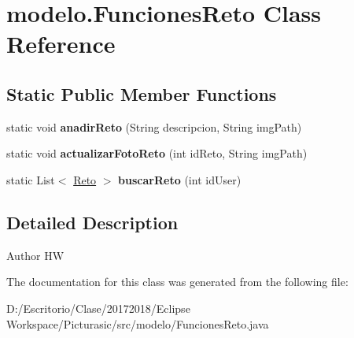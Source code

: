 \hypertarget{classmodelo_1_1_funciones_reto}{}\section{modelo.\+Funciones\+Reto Class Reference}
\label{classmodelo_1_1_funciones_reto}
\subsection*{Static Public Member Functions}
\begin{DoxyCompactItemize}
\item 
\mbox{\label{classmodelo_1_1_funciones_reto_acd04f7cb0f62cd2e1d36922b2c5584c1}} 
static void {\bfseries anadir\+Reto} (String descripcion, String img\+Path)
\item 
\mbox{\label{classmodelo_1_1_funciones_reto_aaf96317180eb9b0ae75e5873892d737a}} 
static void {\bfseries actualizar\+Foto\+Reto} (int id\+Reto, String img\+Path)
\item 
\mbox{\label{classmodelo_1_1_funciones_reto_a255822dd6c53518e851e9f947772538c}} 
static List$<$ \mbox{\hyperlink{classmodelo_1_1_reto}{Reto}} $>$ {\bfseries buscar\+Reto} (int id\+User)
\end{DoxyCompactItemize}


\subsection{Detailed Description}
\begin{DoxyAuthor}{Author}
HW 
\end{DoxyAuthor}


The documentation for this class was generated from the following file\+:\begin{DoxyCompactItemize}
\item 
D\+:/\+Escritorio/\+Clase/20172018/\+Eclipse Workspace/\+Picturasic/src/modelo/Funciones\+Reto.\+java\end{DoxyCompactItemize}
